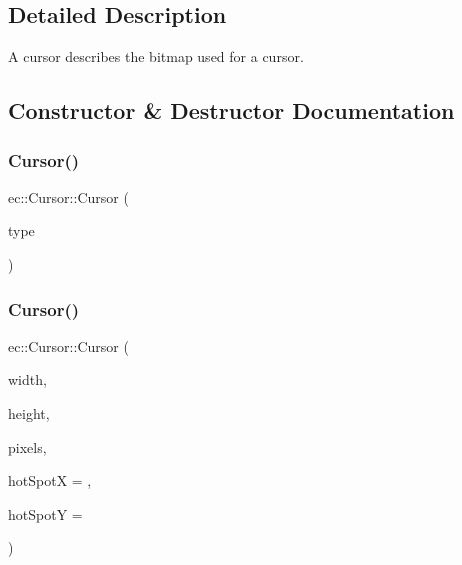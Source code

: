 \subsection{Detailed Description}
A cursor describes the bitmap used for a cursor. 

\subsection{Constructor \& Destructor Documentation}
\mbox{\label{classec_1_1_cursor_a7fd103f9e129b2952484999510d8576a}} 
\subsubsection{\texorpdfstring{Cursor()}{Cursor()}\hspace{0.1cm}{\footnotesize\ttfamily [1/2]}}
{\footnotesize\ttfamily ec\+::\+Cursor\+::\+Cursor (\begin{DoxyParamCaption}\item[{\mbox{\hyperlink{namespaceec_ab32dc7f72e1021f7625fca2b4693d297}{Standard\+Cursor\+Type}}}]{type }\end{DoxyParamCaption})\hspace{0.3cm}{\ttfamily [explicit]}}

\mbox{\label{classec_1_1_cursor_adcbabc67fe488264ee580bcae53de8df}} 
\subsubsection{\texorpdfstring{Cursor()}{Cursor()}\hspace{0.1cm}{\footnotesize\ttfamily [2/2]}}
{\footnotesize\ttfamily ec\+::\+Cursor\+::\+Cursor (\begin{DoxyParamCaption}\item[{int}]{width,  }\item[{int}]{height,  }\item[{unsigned char $\ast$}]{pixels,  }\item[{int}]{hot\+SpotX = {},  }\item[{int}]{hot\+SpotY = {} }\end{DoxyParamCaption})\hspace{0.3cm}{\ttfamily [explicit]}}

